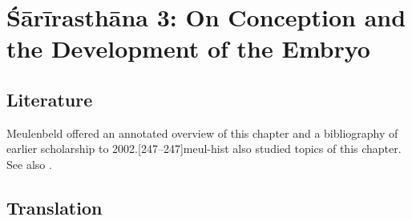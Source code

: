 
\chapter{Śārīrasthāna 3:  On Conception and the Development of the 
Embryo}


\section{Literature} 

Meulenbeld offered an annotated overview of this chapter and a
bibliography of earlier scholarship to
2002.[247--247]{meul-hist}  
\citet[ch.\,8, \emph{et passim}]{das-2003} also
studied topics of this chapter.  See also \cite{krit-2009,krit-2013}.

\section{Translation}


